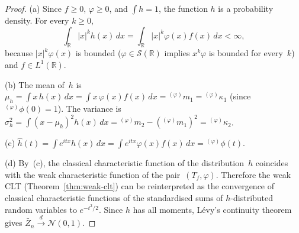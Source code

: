 \documentclass[12pt]{article}
\theoremstyle{definition}
\newcommand{\R}{\mathbb{R}}
\begin{document}
\begin{proof}
(a) Since $f\ge 0$, $\varphi\ge 0$, and $\int h = 1$, the function $h$ is
a probability density.  For every $k\ge 0$,
\[
\int_\R |x|^k h(x)\,dx
=
\int_\R |x|^k \varphi(x) f(x)\,dx
< \infty,
\]
because $|x|^k\varphi(x)$ is bounded ($\varphi\in\mathcal{S}(\R)$ implies
$x^k\varphi$ is bounded for every~$k$) and $f\in L^1(\R)$.

(b) The mean of~$h$ is
$\mu_h = \int x\,h(x)\,dx = \int x\,\varphi(x)f(x)\,dx
= {}^{(\varphi)}m_1 = {}^{(\varphi)}\kappa_1$
(since ${}^{(\varphi)}\phi(0)=1$).  The variance
is $\sigma_h^2 = \int(x-\mu_h)^2 h(x)\,dx
= {}^{(\varphi)}m_2 - ({}^{(\varphi)}m_1)^2 = {}^{(\varphi)}\kappa_2$.

(c) $\widehat{h}(t) = \int e^{itx}h(x)\,dx
= \int e^{itx}\varphi(x)f(x)\,dx = {}^{(\varphi)}\phi(t)$.

(d) By~(c), the classical characteristic function of the distribution~$h$
coincides with the weak characteristic function of the pair~$(T_f,\varphi)$.
Therefore the weak CLT (Theorem~\ref{thm:weak-clt}) can be reinterpreted as
the convergence of classical characteristic functions of the standardised
sums of $h$-distributed random variables to $e^{-t^2/2}$.  Since $h$ has
all moments, L\'evy's continuity theorem~\cite{Billingsley1995} gives
$\bar{Z}_n\xrightarrow{d}\mathcal{N}(0,1)$.
\end{proof}
\end{document}
